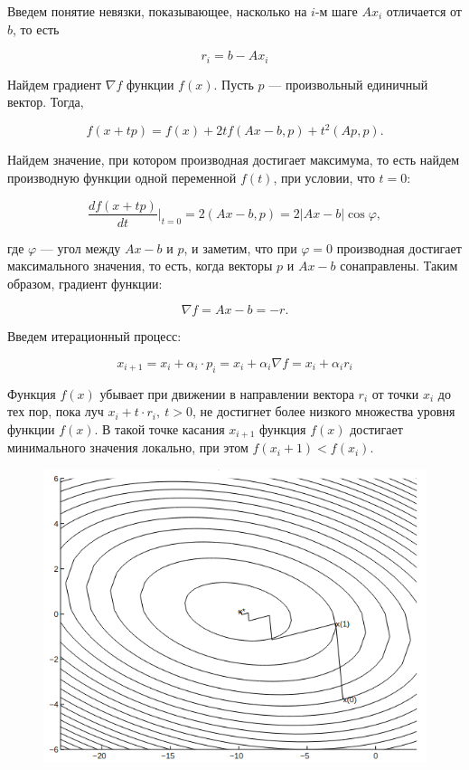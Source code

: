 \documentclass{article}
\begin{document}
Введем понятие невязки, показывающее, насколько на $i$-м шаге $Ax_i$ отличается от $b$, то есть

\begin{equation}
    r_i =  b - Ax_i
\end{equation}

Найдем градиент $\nabla f$ функции $f(x)$. Пусть $p$ --- произвольный единичный вектор. Тогда, 

\begin{equation*}
    f(x + tp) = f(x) + 2tf(Ax - b, p) + t^2 (Ap, p).
\end{equation*}

Найдем значение, при котором производная достигает максимума, то есть найдем производную функции одной переменной
$f(t)$, при условии, что $t = 0$:

\begin{equation}
    \frac{df(x + tp)}{dt} \Bigr|_{t=0} = 2(Ax - b, p) = 2 |Ax - b| \cos \varphi,
\end{equation}

где $\varphi$ --- угол между $Ax - b$ и $p$, и заметим, что при $\varphi = 0$ производная достигает максимального значения, 
то есть, когда векторы $p$ и $Ax - b$ сонаправлены. Таким образом, градиент функции:

\begin{equation*}
    \nabla f = Ax - b = -r.
\end{equation*}

Введем итерационный процесс:

\begin{equation}
    x_{i + 1} = x_{i} + \alpha_{i} \cdot p_{i} = x_{i} + \alpha_i \nabla f= x_i + \alpha_i r_i
\end{equation}

Функция $f(x)$ убывает при движении в направлении вектора $r_i$ от точки $x_i$ до
тех пор, пока луч $x_i + t\cdot r_i, \ t > 0$, не достигнет более низкого множества
уровня функции $f(x)$. В такой точке касания $x_{i + 1}$ функция $f(x)$ достигает минимального значения локально, 
при этом $f(x_i + 1) < f(x_i)$.

\begin{figure}[h]
    \centering
    \includegraphics[width=0.5\linewidth]{image.png}
\end{figure}
\end{document}
